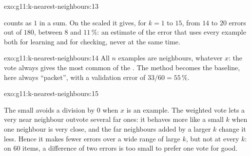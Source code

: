 \begin{solution}{exo:g11:k-nearest-neighbours:13}
\smallskip\noindent\hspace*{2em}

\noindent\hspace*{4em}

\noindent\hspace*{4em}

\noindent\hspace*{6em}

\noindent\hspace*{6em}

\noindent\hspace*{4em}

\smallskip\noindent {} counts as $1$ in a sum. On the scaled  it gives, for $k = 1$ to $15$, from
$14$ to $20$ errors out of $180$, between $8$ and $11\,\%$: an estimate of the error that uses every example both for
learning and for checking, never at the same time.
\end{solution}

\begin{solution}{exo:g11:k-nearest-neighbours:14}
All $n$ examples are neighbours, whatever $x$: the vote always gives the most common  of the . The
method becomes the baseline, here always ``packet'', with a validation error of $33/60 = 55\,\%$.
\end{solution}

\begin{solution}{exo:g11:k-nearest-neighbours:15}
\smallskip\noindent\hspace*{2em}

\noindent\hspace*{4em}

\noindent\hspace*{4em}

\noindent\hspace*{6em}

\noindent\hspace*{4em}

\smallskip\noindent The small  avoids a division by $0$ when $x$ is an example. The weighted vote lets a
very near neighbour outvote several far ones: it behaves more like a small $k$ when one neighbour is very close, and
the far neighbours added by a larger $k$ change it less. Hence it makes fewer errors over a wide range of large $k$,
but not at every $k$: on $60$ items, a difference of two errors is too small to prefer one vote for good.
\end{solution}

